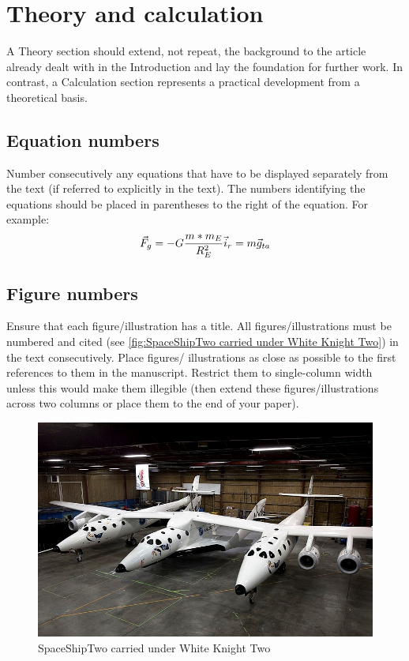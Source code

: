\section{Theory and calculation}
A Theory section should extend, not repeat, the background to the article already dealt with in the Introduction and lay the foundation for further work. In contrast, a Calculation section represents a practical development from a theoretical basis.

\subsection{Equation numbers}
Number consecutively any equations that have to be displayed separately from the text (if referred to explicitly in the text). The numbers identifying the equations should be placed in parentheses to the right of the equation. For example:
\begin{equation}
    \vec{F}_g = -G\frac{m*m_E}{R_E^2}\vec{i}_r = m\vec{g}_{ta}
\end{equation}

\subsection{Figure numbers}
Ensure that each figure/illustration has a title. All figures/illustrations must be numbered and cited (see \autoref{fig:SpaceShipTwo carried under White Knight Two}) in the text consecutively. Place figures/ illustrations as close as possible to the first references to them in the manuscript. Restrict them to single-column width unless this would make them illegible (then extend these figures/illustrations across two columns or place them to the end of your paper).

\begin{figure}[H]
    \centering
    \includegraphics[width=0.8\linewidth]{figures/SpaceShipTwo.jpg}
    \caption{SpaceShipTwo carried under White Knight Two}
    \label{fig:SpaceShipTwo carried under White Knight Two}
\end{figure}

